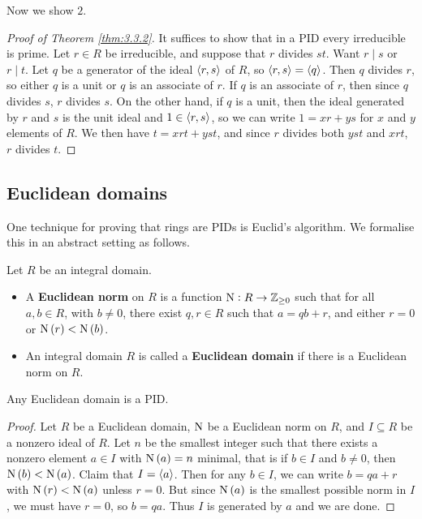 Now we show $ 2 $.

\begin{proof}[Proof of Theorem \ref{thm:3.3.2}]
It suffices to show that in a PID every irreducible is prime. Let $ r \in R $ be irreducible, and suppose that $ r $ divides $ st $. Want $ r \mid s $ or $ r \mid t $. Let $ q $ be a generator of the ideal $ \left\langle r, s \right\rangle $ of $ R $, so $ \left\langle r, s \right\rangle = \left\langle q \right\rangle $. Then $ q $ divides $ r $, so either $ q $ is a unit or $ q $ is an associate of $ r $. If $ q $ is an associate of $ r $, then since $ q $ divides $ s $, $ r $ divides $ s $. On the other hand, if $ q $ is a unit, then the ideal generated by $ r $ and $ s $ is the unit ideal and $ 1 \in \left\langle r, s \right\rangle $, so we can write $ 1 = xr + ys $ for $ x $ and $ y $ elements of $ R $. We then have $ t = xrt + yst $, and since $ r $ divides both $ yst $ and $ xrt $, $ r $ divides $ t $.
\end{proof}

\pagebreak

\subsection{Euclidean domains}


One technique for proving that rings are PIDs is Euclid's algorithm. We formalise this in an abstract setting as follows.

\begin{definition}
Let $ R $ be an integral domain.
\begin{itemize}
\item A \textbf{Euclidean norm} on $ R $ is a function $ \mathrm{N} : R \to \mathbb{Z}_{\ge 0} $ such that for all $ a, b \in R $, with $ b \ne 0 $, there exist $ q, r \in R $ such that $ a = qb + r $, and either $ r = 0 $ or $ \N\br{r} < \N\br{b} $.
\item An integral domain $ R $ is called a \textbf{Euclidean domain} if there is a Euclidean norm on $ R $.
\end{itemize}
\end{definition}

\begin{theorem}
Any Euclidean domain is a PID.
\end{theorem}

\begin{proof}
Let $ R $ be a Euclidean domain, $ \mathrm{N} $ be a Euclidean norm on $ R $, and $ I \subseteq R $ be a nonzero ideal of $ R $. Let $ n $ be the smallest integer such that there exists a nonzero element $ a \in I $ with $ \N\br{a} = n $ minimal, that is if $ b \in I $ and $ b \ne 0 $, then $ \N\br{b} < \N\br{a} $. Claim that $ I = \left\langle a \right\rangle $. Then for any $ b \in I $, we can write $ b = qa + r $ with $ \N\br{r} < \N\br{a} $ unless $ r = 0 $. But since $ \N\br{a} $ is the smallest possible norm in $ I $, we must have $ r = 0 $, so $ b = qa $. Thus $ I $ is generated by $ a $ and we are done.
\end{proof}

